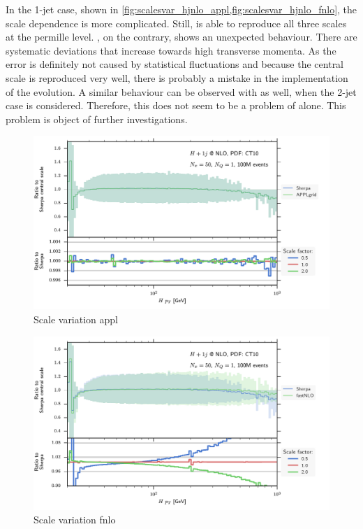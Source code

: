 %

In the 1-jet case, shown in \cref{fig:scalesvar_hjnlo_appl,fig:scalesvar_hjnlo_fnlo}, the scale dependence is more complicated.
Still, \appl{} is able to reproduce all three scales at the permille level.
\fnlo{}, on the contrary, shows an unexpected behaviour.
There are systematic deviations that increase towards high transverse momenta.
As the error is definitely not caused by statistical fluctuations and because the central scale is reproduced very well, there is probably a mistake in the implementation of the evolution.
A similar behaviour can be observed with \appl{} as well, when the 2-jet case is considered.
Therefore, this does not seem to be a problem of \fnlo{} alone.
This problem is object of further investigations.
%
\begin{figure}
	\centering
	\includegraphics[width=\textwidth]{images/scalesvar_hjnlo_appl.pdf}
	\caption{Scale variation appl}
	\label{fig:scalesvar_hjnlo_appl}
\end{figure}
%
\begin{figure}
	\centering
	\includegraphics[width=\textwidth]{images/scalesvar_hjnlo_fnlo.pdf}
	\caption{Scale variation fnlo}
	\label{fig:scalesvar_hjnlo_fnlo}
\end{figure}
%

